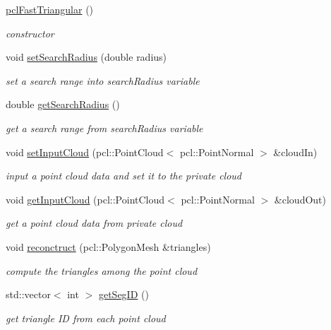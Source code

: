 \begin{DoxyCompactItemize}
\item 
\hyperlink{classpclFastTriangular_a0535f67efbb9378f65b59b1e864467ae}{pcl\+Fast\+Triangular} ()\hypertarget{classpclFastTriangular_a0535f67efbb9378f65b59b1e864467ae}{}\label{classpclFastTriangular_a0535f67efbb9378f65b59b1e864467ae}

\begin{DoxyCompactList}\small\item\em constructor \end{DoxyCompactList}\item 
void \hyperlink{classpclFastTriangular_a46541fbe8942a38c73f059a7bcaeda9c}{set\+Search\+Radius} (double radius)
\begin{DoxyCompactList}\small\item\em set a search range into search\+Radius variable \end{DoxyCompactList}\item 
double \hyperlink{classpclFastTriangular_a866f045ce0907e64c870790641b907a7}{get\+Search\+Radius} ()
\begin{DoxyCompactList}\small\item\em get a search range from search\+Radius variable \end{DoxyCompactList}\item 
void \hyperlink{classpclFastTriangular_acaa55d1c898ea7bf0967051561a6f9fb}{set\+Input\+Cloud} (pcl\+::\+Point\+Cloud$<$ pcl\+::\+Point\+Normal $>$ \&cloud\+In)
\begin{DoxyCompactList}\small\item\em input a point cloud data and set it to the private cloud \end{DoxyCompactList}\item 
void \hyperlink{classpclFastTriangular_ac065538d664120522a4887503011ba20}{get\+Input\+Cloud} (pcl\+::\+Point\+Cloud$<$ pcl\+::\+Point\+Normal $>$ \&cloud\+Out)
\begin{DoxyCompactList}\small\item\em get a point cloud data from private cloud \end{DoxyCompactList}\item 
void \hyperlink{classpclFastTriangular_a7739a064f2e156ce15860c2ca5396965}{reconctruct} (pcl\+::\+Polygon\+Mesh \&triangles)
\begin{DoxyCompactList}\small\item\em compute the triangles among the point cloud \end{DoxyCompactList}\item 
std\+::vector$<$ int $>$ \hyperlink{classpclFastTriangular_ab2c0a020a4ae1fe79b7f81340662c1b4}{get\+Seg\+ID} ()
\begin{DoxyCompactList}\small\item\em get triangle ID from each point cloud \end{DoxyCompactList}\end{DoxyCompactItemize}



